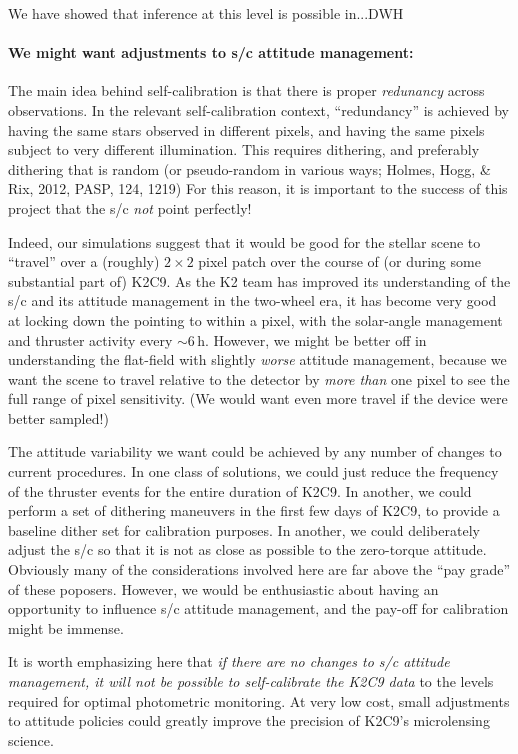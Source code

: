 \documentclass[12pt,preprint]{aastex}
\begin{document}
We have showed that inference at this level is possible in...DWH

\paragraph{We might want adjustments to s/c attitude management:}

The main idea behind self-calibration is that there is proper
\emph{redunancy} across observations.
In the relevant self-calibration context, ``redundancy'' is achieved
by having the same stars observed in different pixels, and having the
same pixels subject to very different illumination.
This requires dithering, and preferably dithering that is random (or
pseudo-random in various ways; Holmes, Hogg, \& Rix, 2012, PASP, 124,
1219)
For this reason, it is important to the success of this project that
the s/c \emph{not} point perfectly!

Indeed, our simulations suggest that it would be good for the stellar
scene to ``travel'' over a (roughly) $2\times2$ pixel patch over the
course of (or during some substantial part of) K2C9.
As the K2 team has improved its understanding of the s/c and its
attitude management in the two-wheel era, it has become very good at
locking down the pointing to within a pixel, with the solar-angle
management and thruster activity every $\sim 6$\,h.
However, we might be better off in understanding the flat-field with
slightly \emph{worse} attitude management, because we want the scene
to travel relative to the detector by \emph{more than} one pixel to
see the full range of pixel sensitivity.
(We would want even more travel if the device were better sampled!)

The attitude variability we want could be achieved by any number of
changes to current procedures.
In one class of solutions, we could just reduce the frequency of the
thruster events for the entire duration of K2C9.
In another, we could perform a set of dithering maneuvers in the first
few days of K2C9, to provide a baseline dither set for calibration
purposes.
In another, we could deliberately adjust the s/c so that it is not as
close as possible to the zero-torque attitude.
Obviously many of the considerations involved here are far above the 
``pay grade'' of these poposers.
However, we would be enthusiastic about having an opportunity to influence
s/c attitude management, and the pay-off for calibration might be immense.

It is worth emphasizing here that \emph{if there are no changes to s/c
  attitude management, it will not be possible to self-calibrate the
  K2C9 data} to the levels required for optimal photometric monitoring.
At very low cost, small adjustments to attitude policies could greatly
improve the precision of K2C9's microlensing science.
\end{document}
